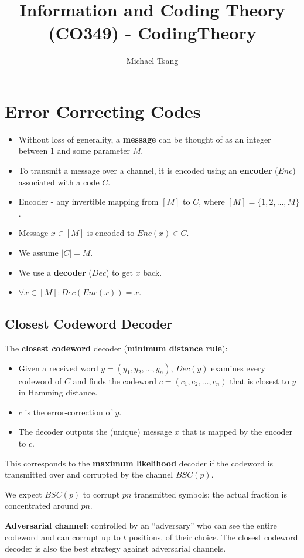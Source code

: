 \documentclass[11pt]{article}
\title{Information and Coding Theory (CO349) - CodingTheory}
\author{Michael Tsang}
\begin{document}
\maketitle

\section{Error Correcting Codes}
\begin{itemize}
  \item Without loss of generality, a \textbf{message} can be thought of as an integer between $1$ and some parameter $M$.
  \item To transmit a message over a channel, it is encoded using an \textbf{encoder} ($Enc$) associated with a code $C$.
  \item Encoder - any invertible mapping from $[M]$ to $C$, where $[M] = \{ 1, 2, \ldots, M\}$.
  \item Message $x \in [M]$ is encoded to $Enc(x) \in C$.
  \item We assume $\lvert C \rvert = M$.
  \item We use a \textbf{decoder} ($Dec$) to get $x$ back.
  \item $\forall x \in [M] : Dec(Enc(x)) = x$.
\end{itemize}

\subsection{Closest Codeword Decoder}
The \textbf{closest codeword} decoder (\textbf{minimum distance rule}):
\begin{itemize}
  \item Given a received word $y = (y_1, y_2, \ldots, y_n)$, $Dec(y)$ examines every codeword of $C$ and finds the codeword $c = (c_1, c_2, \ldots, c_n)$ that is closest to $y$ in Hamming distance.
  \item $c$ is the error-correction of $y$.
  \item The decoder outputs the (unique) message $x$ that is mapped by the encoder to $c$.
\end{itemize}

This corresponds to the \textbf{maximum likelihood} decoder if the codeword is transmitted over and corrupted by the channel $BSC(p)$.

We expect $BSC(p)$ to corrupt $pn$ transmitted symbols; the actual fraction is concentrated around $pn$.

\textbf{Adversarial channel}: controlled by an ``adversary'' who can see the entire codeword and can corrupt up to $t$ positions, of their choice.
The closest codeword decoder is also the best strategy against adversarial channels.
\end{document}
